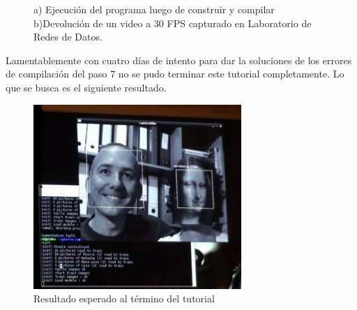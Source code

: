 \documentclass[letterpaper,12pt]{article}
\begin{document}
\begin{figure}[H]
\centering
{}
\caption{a) Ejecución del programa luego de construir y compilar b)Devolución de un video a 30 FPS capturado en Laboratorio de Redes de Datos.}
\label{Fig:Video}
\end{figure}
 
 Lamentablemente con cuatro días de intento para dar la soluciones de los errores de compilación del paso 7 no se pudo terminar este tutorial completamente. Lo que se busca es el siguiente resultado.
 
\begin{figure}[H]
\centering
\includegraphics[scale=0.8]{Figs/Paso7.png}
\caption{Resultado esperado al término del tutorial}
\label{Fig:Thinki}
\end{figure} 
 
\end{document}
